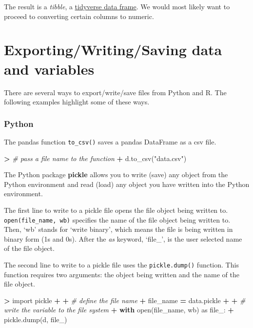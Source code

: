 \documentclass[
]{book}
\newenvironment{Shaded}{\begin{snugshade}}{\end{snugshade}}
\newcommand{\BuiltInTok}[1]{#1}
\newcommand{\CommentTok}[1]{\textcolor[rgb]{0.56,0.35,0.01}{\textit{#1}}}
\newcommand{\ControlFlowTok}[1]{\textcolor[rgb]{0.13,0.29,0.53}{\textbf{#1}}}
\newcommand{\ImportTok}[1]{#1}
\newcommand{\NormalTok}[1]{#1}
\newcommand{\OperatorTok}[1]{\textcolor[rgb]{0.81,0.36,0.00}{\textbf{#1}}}
\newcommand{\StringTok}[1]{\textcolor[rgb]{0.31,0.60,0.02}{#1}}
\begin{document}
The result is a \emph{tibble}, a \href{https://tibble.tidyverse.org/}{tidyverse data frame}. We would most likely want to proceed to converting certain columns to numeric.

\hypertarget{exportingwritingsaving-data-and-variables}{%
\section{Exporting/Writing/Saving data and variables}\label{exportingwritingsaving-data-and-variables}}

There are several ways to export/write/save files from Python and R. The following examples highlight some of these ways.

\hypertarget{python-16}{%
\subsubsection*{Python}\label{python-16}}

The pandas function \texttt{to\_csv()} saves a pandas DataFrame as a csv file.

\begin{Shaded}
\begin{Highlighting}[]
\OperatorTok{\textgreater{}} \CommentTok{\# pass a file name to the function}
\OperatorTok{+}\NormalTok{ d.to\_csv(}\StringTok{"data.csv"}\NormalTok{)}
\end{Highlighting}
\end{Shaded}

The Python package \textbf{pickle} allows you to write (save) any object from the Python environment and read (load) any object you have written into the Python environment.

The first line to write to a pickle file opens the file object being written to. \texttt{open(file\_name,\ \textquotesingle{}wb\textquotesingle{})} specifies the name of the file object being written to. Then, `wb' stands for `write binary', which means the file is being written in binary form (1s and 0s). After the \emph{as} keyword, `file\_', is the user selected name of the file object.

The second line to write to a pickle file uses the \texttt{pickle.dump()} function. This function requires two arguments: the object being written and the name of the file object.

\begin{Shaded}
\begin{Highlighting}[]
\OperatorTok{\textgreater{}} \ImportTok{import}\NormalTok{ pickle}
\OperatorTok{+} 
\OperatorTok{+} \CommentTok{\# define the file name}
\OperatorTok{+}\NormalTok{ file\_name }\OperatorTok{=} \StringTok{\textquotesingle{}data.pickle\textquotesingle{}}
\OperatorTok{+} 
\OperatorTok{+} \CommentTok{\# write the variable to the file system}
\OperatorTok{+} \ControlFlowTok{with} \BuiltInTok{open}\NormalTok{(file\_name, }\StringTok{\textquotesingle{}wb\textquotesingle{}}\NormalTok{) }\ImportTok{as}\NormalTok{ file\_:}
\OperatorTok{+}\NormalTok{     pickle.dump(d, file\_)}
\end{Highlighting}
\end{Shaded}
\end{document}
